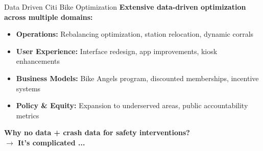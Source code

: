 \documentclass[aspectratio=169,xcolor={usenames,dvipsnames,svgnames,table},10pt,usepdftitle=false,hyperref={bookmarksdepth=3}]{beamer}
\begin{document}

\begin{frame}{Data Driven Citi Bike Optimization}
    \vspace{0.2cm}
    \textbf{Extensive data-driven optimization across multiple domains:}
    \small
    \begin{itemize}
        \item \textbf{Operations:} Rebalancing optimization, station relocation, dynamic corrals
        \item \textbf{User Experience:} Interface redesign, app improvements, kiosk enhancements
        \item \textbf{Business Models:} Bike Angels program, discounted memberships, incentive systems
        \item \textbf{Policy \& Equity:} Expansion to underserved areas, public accountability metrics
    \end{itemize}
    
    \vspace{0.3cm}
    \normalsize
    \textbf{Why no data + crash data for safety interventions?} \\
    \vspace{0.3cm}
    \textbf{$\rightarrow$ It's complicated ...}
\end{frame}

\end{document}
